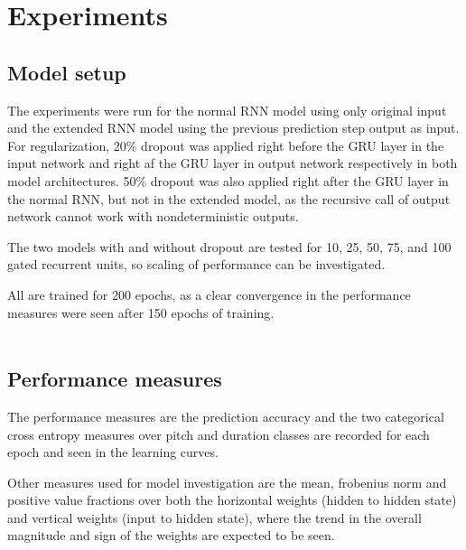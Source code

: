 \section{Experiments}
\label{sec:experiments}

\subsection{Model setup}

The experiments were run for the normal RNN model using only original input and the extended RNN model using the previous prediction step output as input. For regularization, 20\% dropout was applied right before the GRU layer in the input network and right af the GRU layer in output network respectively in both model architectures. 50\% dropout was also applied right after the GRU layer in the normal RNN, but not in the extended model, as the recursive call of output network cannot work with nondeterministic outputs. 

The two models with and without dropout are tested for 10, 25, 50, 75, and 100 gated recurrent units, so scaling of performance can be investigated. 

All are trained for 200 epochs, as a clear convergence in the performance measures were seen after 150 epochs of training. \\ \\
\subsection{Performance measures}

The performance measures are the prediction accuracy and the two categorical cross entropy measures over pitch and duration classes are recorded for each epoch and seen in the learning curves.

Other measures used for model investigation are the mean, frobenius norm and positive value fractions over both the horizontal weights (hidden to hidden state) and vertical weights (input to hidden state), where the trend in the overall magnitude and sign of the weights are expected to be seen. \\ \\
